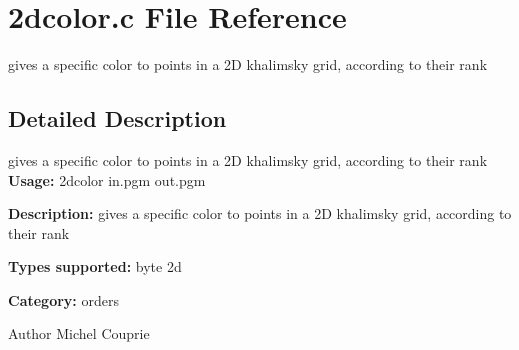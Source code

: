 \section{2dcolor.c File Reference}
\label{2dcolor_8c}


gives a specific color to points in a 2D khalimsky grid, according to their rank  




\subsection{Detailed Description}
gives a specific color to points in a 2D khalimsky grid, according to their rank {\bfseries Usage:} 2dcolor in.pgm out.pgm

{\bfseries Description:} gives a specific color to points in a 2D khalimsky grid, according to their rank

{\bfseries Types supported:} byte 2d

{\bfseries Category:} orders

\begin{DoxyAuthor}{Author}
Michel Couprie 
\end{DoxyAuthor}
